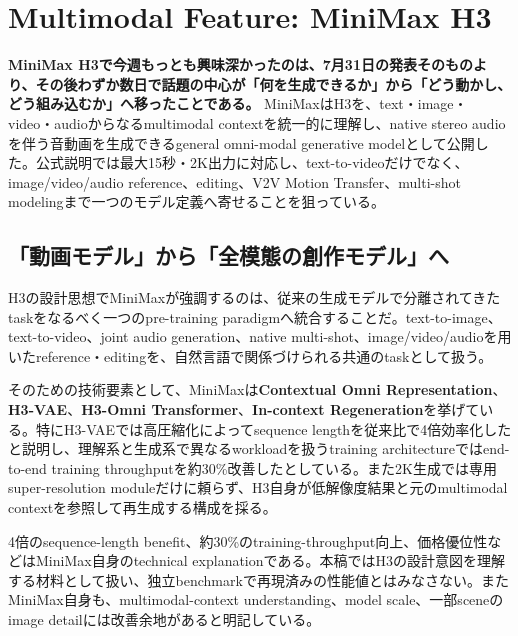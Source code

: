 \section{Multimodal Feature: MiniMax H3}

\textbf{MiniMax H3で今週もっとも興味深かったのは、7月31日の発表そのものより、その後わずか数日で話題の中心が「何を生成できるか」から「どう動かし、どう組み込むか」へ移ったことである。}
MiniMaxはH3を、text・image・video・audioからなるmultimodal contextを統一的に理解し、native stereo audioを伴う音動画を生成できるgeneral omni-modal generative modelとして公開した。公式説明では最大15秒・2K出力に対応し、text-to-videoだけでなく、image/video/audio reference、editing、V2V Motion Transfer、multi-shot modelingまで一つのモデル定義へ寄せることを狙っている\cite{minimax-h3-blog}。

\subsection*{「動画モデル」から「全模態の創作モデル」へ}

H3の設計思想でMiniMaxが強調するのは、従来の生成モデルで分離されてきたtaskをなるべく一つのpre-training paradigmへ統合することだ。text-to-image、text-to-video、joint audio generation、native multi-shot、image/video/audioを用いたreference・editingを、自然言語で関係づけられる共通のtaskとして扱う\cite{minimax-h3-blog}。

そのための技術要素として、MiniMaxは\textbf{Contextual Omni Representation}、\textbf{H3-VAE}、\textbf{H3-Omni Transformer}、\textbf{In-context Regeneration}を挙げている。特にH3-VAEでは高圧縮化によってsequence lengthを従来比で4倍効率化したと説明し、理解系と生成系で異なるworkloadを扱うtraining architectureではend-to-end training throughputを約30\%改善したとしている。また2K生成では専用super-resolution moduleだけに頼らず、H3自身が低解像度結果と元のmultimodal contextを参照して再生成する構成を採る\cite{minimax-h3-blog}。

\begin{claimboundary}
4倍のsequence-length benefit、約30\%のtraining-throughput向上、価格優位性などはMiniMax自身のtechnical explanationである。本稿ではH3の設計意図を理解する材料として扱い、独立benchmarkで再現済みの性能値とはみなさない。またMiniMax自身も、multimodal-context understanding、model scale、一部sceneのimage detailには改善余地があると明記している\cite{minimax-h3-blog}。
\end{claimboundary}

